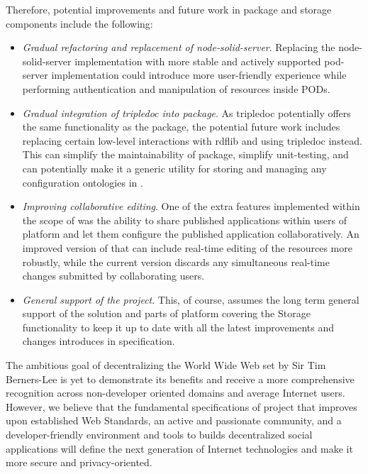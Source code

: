 Therefore, potential improvements and future work in \lpas{} package and storage components include the following:
\begin{itemize}
    \item \textit{Gradual refactoring and replacement of node-solid-server}. Replacing the node-solid-server implementation with more stable and actively supported pod-server implementation could introduce more user-friendly experience while performing authentication and manipulation of resources inside \solid{} PODs.
    \item \textit{Gradual integration of tripledoc into \lpas{} package}. As tripledoc potentially offers the same functionality as the \lpas{} package, the potential future work includes replacing certain low-level interactions with rdflib and using tripledoc instead. This can simplify the maintainability of \lpas{} package, simplify unit-testing, and can potentially make it a generic utility for storing and managing any configuration ontologies in \solid{}.
    \item \textit{Improving collaborative editing}. One of the extra features implemented within the scope of \lpas{} was the ability to share published applications within users of \lpa{} platform and let them configure the published application collaboratively. An improved version of that can include real-time editing of the resources more robustly, while the current version discards any simultaneous real-time changes submitted by collaborating users.
    \item \textit{General support of the project}. This, of course, assumes the long term general support of the solution and parts of \lpa{} platform covering the Storage functionality to keep it up to date with all the latest improvements and changes introduces in \solid{} specification.
\end{itemize}

The ambitious goal of decentralizing the World Wide Web set by Sir Tim Berners-Lee is yet to demonstrate its benefits and receive a more comprehensive recognition across non-developer oriented domains and average Internet users. However, we believe that the fundamental specifications of \solid{} project that improves upon established Web Standards, an active and passionate community, and a developer-friendly environment and tools to builds decentralized social applications will define the next generation of Internet technologies and make it more secure and privacy-oriented.